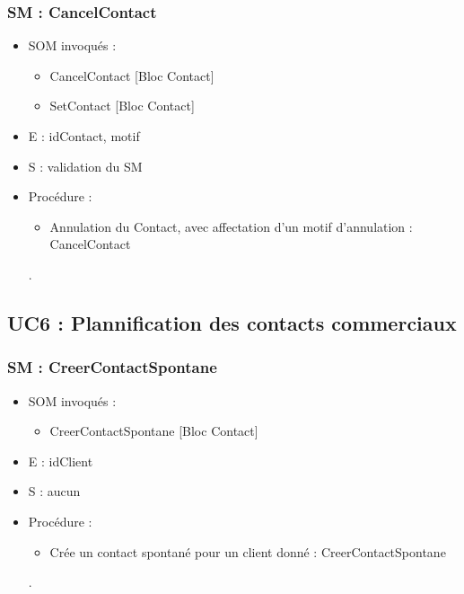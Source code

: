 \subsubsection{SM : CancelContact}
\begin{itemize}
	\item SOM invoqués : 
	\begin{itemize}
		\item CancelContact [Bloc Contact]
		\item SetContact [Bloc Contact]
	\end{itemize}
	\item E : idContact, motif
	\item S : validation du SM
	\item Procédure : 
	\begin{itemize}
		\item Annulation du Contact, avec affectation d’un motif d’annulation : CancelContact
	\end{itemize}.
\end{itemize}



\subsection{UC6 : Plannification des contacts commerciaux}

\subsubsection{SM : CreerContactSpontane}
\begin{itemize}
	\item SOM invoqués : 
	\begin{itemize}
		\item CreerContactSpontane [Bloc Contact]
	\end{itemize}
	\item E : idClient
	\item S : aucun
	\item Procédure : 
	\begin{itemize}
		\item Crée un contact spontané pour un client donné : CreerContactSpontane
	\end{itemize}.
\end{itemize}

